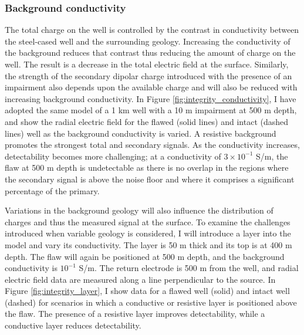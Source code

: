 

\subsubsection{Background conductivity}

The total charge on the well is controlled by the contrast in conductivity between the steel-cased well and the surrounding geology. Increasing the conductivity of the background reduces that contrast thus reducing the amount of charge on the well. The result is a decrease in the total electric field at the surface. Similarly, the strength of the secondary dipolar charge introduced with the presence of an impairment also depends upon the available charge and will also be reduced with increasing background conductivity. In Figure \ref{fig:integrity_conductivity}, I have adopted the same model of a 1 km well with a 10 m impairment at 500 m depth, and show the radial electric field for the flawed (solid lines) and intact (dashed lines) well as the background conductivity is varied. A resistive background promotes the strongest total and secondary signals. As the conductivity increases, detectability becomes more challenging; at a conductivity of $3 \times 10^{-1}$ S/m, the flaw at 500 m depth is undetectable as there is no overlap in the regions where the secondary signal is above the noise floor and where it comprises a significant percentage of the primary.




Variations in the background geology will also influence the distribution of charges and thus the measured signal at the surface. To examine the challenges introduced when variable geology is considered, I will introduce a layer into the model and vary its conductivity. The layer is 50 m thick and its top is at 400 m depth. The flaw will again be positioned at 500 m depth, and the background conductivity is $10^{-1}$ S/m. The return electrode is 500 m from the well, and radial electric field data are measured along a line perpendicular to the source. In Figure \ref{fig:integrity_layer}, I show data for a flawed well (solid) and intact well (dashed) for scenarios in which a conductive or resistive layer is positioned above the flaw. The presence of a resistive layer improves detectability, while a conductive layer reduces detectability.



